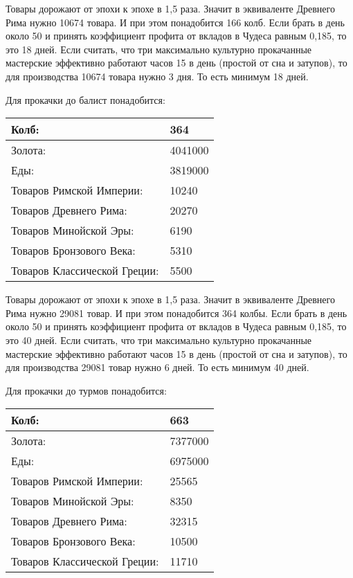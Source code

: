 Товары дорожают от эпохи к эпохе в 1,5 раза.
Значит в эквиваленте Древнего Рима нужно 10674 товара.
И при этом понадобится 166 колб. Если брать в день около 50 и принять коэффициент профита от вкладов
в Чудеса равным 0,185, то это 18 дней.
Если считать, что три максимально культурно прокачанные мастерские эффективно работают часов 15 в день (простой от сна и затупов),
то для производства 10674 товара нужно 3 дня.
То есть минимум 18 дней.


Для прокачки до балист понадобится:

\begin{center}
    \begin{tabular}[h!]{|l|l|}
        \hline
        Колб:   & 364 \\\hline
        Золота: & 4041000 \\\hline
        Еды:    & 3819000 \\\hline
        Товаров Римской Империи: & 10240 \\\hline
        Товаров Древнего Рима: & 20270 \\\hline
        Товаров Минойской Эры: & 6190 \\\hline
        Товаров Бронзового Века: & 5310 \\\hline
        Товаров Классической Греции: & 5500 \\\hline
    \end{tabular}
\end{center}

Товары дорожают от эпохи к эпохе в 1,5 раза.
Значит в эквиваленте Древнего Рима нужно 29081 товар.
И при этом понадобится 364 колбы. Если брать в день около 50 и принять коэффициент профита от вкладов
в Чудеса равным 0,185, то это 40 дней.
Если считать, что три максимально культурно прокачанные мастерские эффективно работают часов 15 в день (простой от сна и затупов),
то для производства 29081 товар нужно 6 дней.
То есть минимум 40 дней.


Для прокачки до турмов понадобится:

\begin{center}
    \begin{tabular}[h!]{|l|l|}
        \hline
        Колб:   & 663 \\\hline
        Золота: & 7377000 \\\hline
        Еды:    & 6975000 \\\hline
        Товаров Римской Империи: & 25565 \\\hline
        Товаров Минойской Эры: & 8350 \\\hline
        Товаров Древнего Рима: & 32315 \\\hline
        Товаров Бронзового Века: & 10500 \\\hline
        Товаров Классической Греции: & 11710 \\\hline
    \end{tabular}
\end{center}

